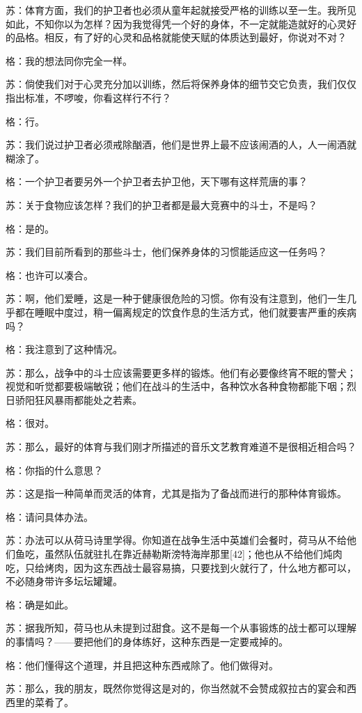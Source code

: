 \documentclass[12pt,oneside]{book}
\begin{document}
苏：体育方面，我们的护卫者也必须从童年起就接受严格的训练以至一生。我所见如此，不知你以为怎样？因为我觉得凭一个好的身体，不一定就能造就好的心灵好的品格。相反，有了好的心灵和品格就能使天赋的体质达到最好，你说对不对？

格：我的想法同你完全一样。

苏：倘使我们对于心灵充分加以训练，然后将保养身体的细节交它负责，我们仅仅指出标准，不啰唆，你看这样行不行？

格：行。

苏：我们说过护卫者必须戒除酗酒，他们是世界上最不应该闹酒的人，人一闹酒就糊涂了。

格：一个护卫者要另外一个护卫者去护卫他，天下哪有这样荒唐的事？

苏：关于食物应该怎样？我们的护卫者都是最大竞赛中的斗士，不是吗？

格：是的。

苏：我们目前所看到的那些斗士，他们保养身体的习惯能适应这一任务吗？

格：也许可以凑合。

苏：啊，他们爱睡，这是一种于健康很危险的习惯。你有没有注意到，他们一生几乎都在睡眠中度过，稍一偏离规定的饮食作息的生活方式，他们就要害严重的疾病吗？

格：我注意到了这种情况。

苏：那么，战争中的斗士应该需要更多样的锻炼。他们有必要像终宵不眠的警犬；视觉和听觉都要极端敏锐；他们在战斗的生活中，各种饮水各种食物都能下咽；烈日骄阳狂风暴雨都能处之若素。

格：很对。

苏：那么，最好的体育与我们刚才所描述的音乐文艺教育难道不是很相近相合吗？

格：你指的什么意思？

苏：这是指一种简单而灵活的体育，尤其是指为了备战而进行的那种体育锻炼。

格：请问具体办法。

苏：办法可以从荷马诗里学得。你知道在战争生活中英雄们会餐时，荷马从不给他们鱼吃，虽然队伍就驻扎在靠近赫勒斯滂特海岸那里[42]；他也从不给他们炖肉吃，只给烤肉，因为这东西战士最容易搞，只要找到火就行了，什么地方都可以，不必随身带许多坛坛罐罐。

格：确是如此。

苏：据我所知，荷马也从未提到过甜食。这不是每一个从事锻炼的战士都可以理解的事情吗？——要把他们的身体练好，这种东西是一定要戒掉的。

格：他们懂得这个道理，并且把这种东西戒除了。他们做得对。

苏：那么，我的朋友，既然你觉得这是对的，你当然就不会赞成叙拉古的宴会和西西里的菜肴了。
\end{document}
